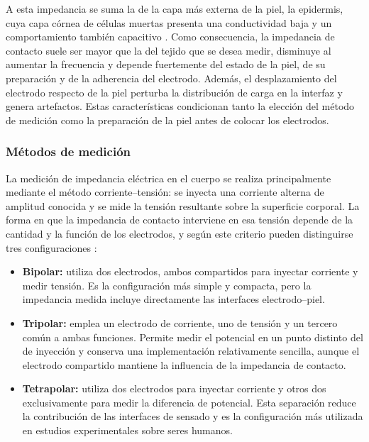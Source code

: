 \documentclass[12pt,a4paper]{article}
\begin{document}
A esta impedancia se suma la de la capa más externa de la piel, la epidermis, cuya capa córnea
de células muertas presenta una conductividad baja y un comportamiento también capacitivo
\cite{grimnes2015bioimpedance}. Como consecuencia, la impedancia de contacto suele ser mayor que la
del tejido que se desea medir, disminuye al aumentar la frecuencia y depende fuertemente del estado de
la piel, de su preparación y de la adherencia del electrodo. Además, el desplazamiento del electrodo
respecto de la piel perturba la distribución de carga en la interfaz y genera artefactos. Estas
características condicionan tanto la elección del método de medición como la preparación de la piel
antes de colocar los electrodos.

\subsubsection{Métodos de medición}

La medición de impedancia eléctrica en el cuerpo se realiza principalmente mediante el método
corriente--tensión: se inyecta una corriente alterna de amplitud conocida y se mide la tensión
resultante sobre la superficie corporal. La forma en que la impedancia de contacto interviene en esa
tensión depende de la cantidad y la función de los electrodos, y según este criterio pueden
distinguirse tres configuraciones \cite{noyori2022review}:

\begin{itemize}
    \item \textbf{Bipolar:} utiliza dos electrodos, ambos compartidos para inyectar corriente y medir
    tensión. Es la configuración más simple y compacta, pero la impedancia medida incluye directamente
    las interfaces electrodo--piel.
    \item \textbf{Tripolar:} emplea un electrodo de corriente, uno de tensión y un tercero común a
    ambas funciones. Permite medir el potencial en un punto distinto del de inyección y conserva una
    implementación relativamente sencilla, aunque el electrodo compartido mantiene la influencia de
    la impedancia de contacto.
    \item \textbf{Tetrapolar:} utiliza dos electrodos para inyectar corriente y otros dos exclusivamente
    para medir la diferencia de potencial. Esta separación reduce la contribución de las interfaces de
    sensado y es la configuración más utilizada en estudios experimentales sobre seres humanos.
\end{itemize}
\end{document}
